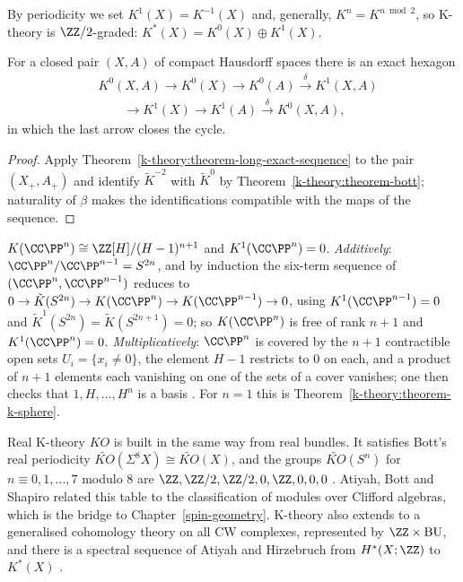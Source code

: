 \begin{definition}\label{k-theory:definition-odd-k}
By periodicity we set $K^1(X) = K^{-1}(X)$ and, generally, $K^n = K^{n \bmod 2}$, so K-theory is $\ZZ/2$-graded: $K^*(X) = K^0(X) \oplus K^1(X)$.
\end{definition}

\begin{corollary}\label{k-theory:corollary-six-term}
For a closed pair $(X, A)$ of compact Hausdorff spaces there is an exact hexagon
\[
\begin{aligned}
&K^0(X, A) \to K^0(X) \to K^0(A) \xrightarrow{\ \delta\ } K^1(X, A) \\
&\qquad \to K^1(X) \to K^1(A) \xrightarrow{\ \delta\ } K^0(X, A),
\end{aligned}
\]
in which the last arrow closes the cycle.
\end{corollary}

\begin{proof}
Apply Theorem~\ref{k-theory:theorem-long-exact-sequence} to the pair $(X_+, A_+)$ and identify $\tilde{K}^{-2}$ with $\tilde{K}^0$ by Theorem~\ref{k-theory:theorem-bott}; naturality of $\beta$ makes the identifications
compatible with the maps of the sequence.
\end{proof}

\begin{example}\label{k-theory:example-k-projective}
$K(\CC\PP^n) \cong \ZZ[H]/(H - 1)^{n+1}$ and $K^1(\CC\PP^n) = 0$. \emph{Additively}: $\CC\PP^n/\CC\PP^{n-1} = S^{2n}$, and by induction the six-term sequence of $(\CC\PP^n, \CC\PP^{n-1})$ reduces to
$0 \to \tilde{K}(S^{2n}) \to K(\CC\PP^n) \to K(\CC\PP^{n-1}) \to 0$, using $K^1(\CC\PP^{n-1}) = 0$ and $\tilde{K}^1(S^{2n}) = \tilde{K}(S^{2n+1}) = 0$; so $K(\CC\PP^n)$ is free of rank $n + 1$ and $K^1(\CC\PP^n) = 0$.
\emph{Multiplicatively}: $\CC\PP^n$ is covered by the $n + 1$ contractible open sets $U_i = \{x_i \neq 0\}$, the element $H - 1$ restricts to $0$ on each, and a product of $n + 1$ elements each vanishing on one of the
sets of a cover vanishes; one then checks that $1, H, \ldots, H^n$ is a basis \cite[Chapter 2]{hatcher-vbkt}. For $n = 1$ this is Theorem~\ref{k-theory:theorem-k-sphere}.
\end{example}

\begin{remark}\label{k-theory:remark-real-k-theory}
Real K-theory $KO$ is built in the same way from real bundles. It satisfies Bott's real periodicity $\widetilde{KO}(\Sigma^8X) \cong \widetilde{KO}(X)$, and the groups $\widetilde{KO}(S^n)$ for $n \equiv 0, 1, \ldots, 7$
modulo $8$ are $\ZZ, \ZZ/2, \ZZ/2, 0, \ZZ, 0, 0, 0$ \cite{bott-1959}. Atiyah, Bott and Shapiro related this table to the classification of modules over Clifford algebras, which is the bridge to
Chapter~\ref{spin-geometry}. K-theory also extends to a generalised cohomology theory on all CW complexes, represented by $\ZZ \times \mathrm{BU}$, and there is a spectral sequence of Atiyah and Hirzebruch
from $H^*(X; \ZZ)$ to $K^*(X)$ \cite{atiyah-k-theory}.
\end{remark}

